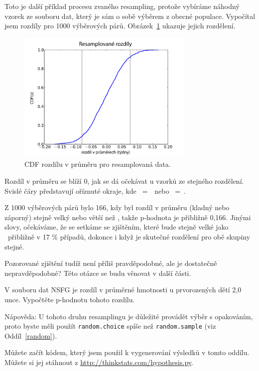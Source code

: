 \documentclass[12pt]{book}
\begin{document}
Toto je další příklad procesu zvaného resampling, protože vybíráme náhodný vzorek
ze souboru dat, který je sám o sobě výběrem z obecné populace.
Vypočítal jsem rozdíly pro 1000 výběrových párů.
Obrázek~\ref{length_deltas_cdf} ukazuje jejich rozdělení.

\begin{figure}
\centerline{\includegraphics[height=2.5in]{figs/length_deltas_cdf.pdf}}
\caption{CDF rozdílu v průměru pro resamplovaná data.}
\label{length_deltas_cdf}
\end{figure}

Rozdíl v průměru se blíží 0, jak se dá očekávat u vzorků ze stejného rozdělení. Svislé čáry představují oříznuté okraje, kde
\x~=~\minus\mydelta~nebo \x~=~\mydelta.

Z 1000 výběrových párů bylo 166, kdy byl rozdíl v průměru (kladný nebo záporný) stejně velký nebo
větší než \mydelta, takže p-hodnota je přibližně 0,166.  Jinými slovy, očekáváme, že se setkáme se zjištěním, které bude stejně velké jako \mydelta~přibližně v 17 \% případů, dokonce i když je skutečné rozdělení pro obě skupiny stejné.

Pozorované zjištění tudíž není příliš pravděpodobné, ale je dostatečně nepravděpodobné? Této otázce se budu věnovat v další části.

\begin{exercise}
V souboru dat NSFG je rozdíl v průměrné hmotnosti u prvorozených dětí 2,0 unce. Vypočtěte p-hodnotu tohoto rozdílu.

Nápověda: U tohoto druhu resamplingu je důležité provádět výběr s opakováním, proto byste měli použít
 {\tt random.choice} spíše než {\tt random.sample} (viz Oddíl~\ref{random}).

Můžete začít kódem, který jsem použil k vygenerování výsledků v tomto oddílu. Můžete si jej stáhnout z \url{http://thinkstats.com/hypothesis.py}.

\end{exercise}
\end{document}
